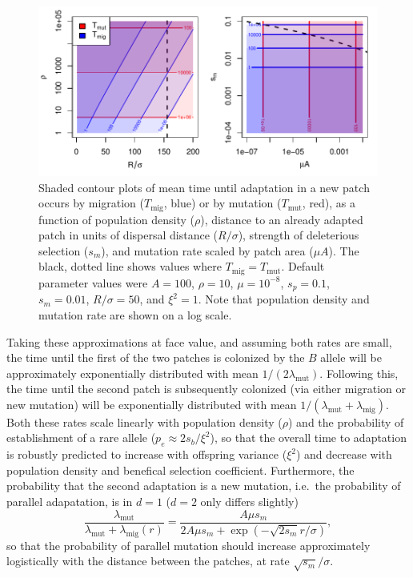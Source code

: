 \documentclass{article}
\newcommand{\migrate}{\lambda_\text{mig}}
\newcommand{\mutrate}{\lambda_\text{mut}}
\newcommand{\Tmig}{T_\text{mig}}
\newcommand{\Tmut}{T_\text{mut}}
\begin{document}
\begin{figure}[ht]
  \begin{center}
    \includegraphics{phase-diagram-log}
  \end{center}
  \caption{
  Shaded contour plots of
  mean time until adaptation in a new patch occurs by migration ($\Tmig$, blue) or by mutation ($\Tmut$, red),
  as a function of population density ($\rho$), 
  distance to an already adapted patch in units of dispersal distance ($R/\sigma$),
  strength of deleterious selection ($s_m$),
  and mutation rate scaled by patch area ($\mu A$).
  The black, dotted line shows values where $\Tmig=\Tmut$.
  Default parameter values were $A=100$, $\rho=10$, $\mu=10^{-8}$, $s_p=0.1$, $s_m=0.01$, $R/\sigma=50$, and $\xi^2=1$.
  Note that population density and mutation rate are shown on a log scale.
  \label{fig:phase_diagram}
  }
\end{figure}

Taking these approximations at face value, 
and assuming both rates are small, 
the time until the first of the two patches is colonized by the $B$
allele will be approximately exponentially distributed with mean $1/(2
\mutrate)$.
Following this, the time until the second patch is subsequently colonized 
(via either migration or new mutation) 
will be exponentially distributed with mean $1/(\mutrate+\migrate)$.
Both these rates scale linearly with population density ($\rho$) 
and the probability of establishment of a rare allele ($p_e\approx 2 s_b/\xi^2$),
so that the overall time to adaptation is robustly predicted to increase with offspring variance ($\xi^2$)
and decrease with population density and benefical selection coefficient.
Furthermore, the probability that the second adaptation is a new mutation,
i.e.\ the probability of parallel adapatation, is in $d=1$ ($d=2$ only differs slightly)
\begin{equation} \label{eqn:parallel_prob}
  \frac{\mutrate}{\mutrate+\migrate(r)} = \frac{ A \mu s_m }{2 A \mu s_m + \exp\left(- \sqrt{2 s_m} r / \sigma \right) },  
\end{equation}
so that the probability of parallel mutation should increase
approximately logistically with the distance between the patches, at rate $\sqrt{s_m} /\sigma$. 
\end{document}
